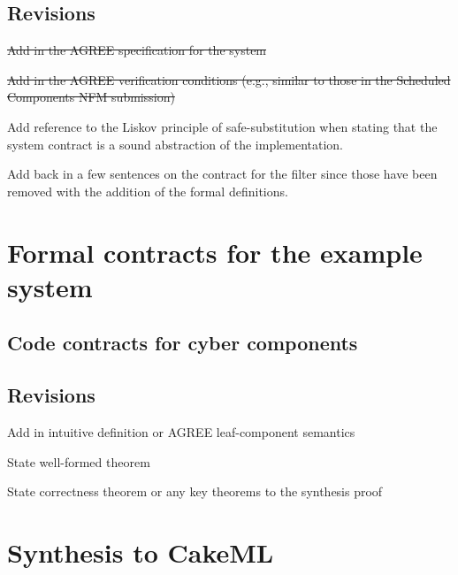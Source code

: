 \documentclass[global,twocolumn]{svjour}
\begin{document}
\subsection{Revisions}
\begin{compactitem}
  \item \sout{Add in the AGREE specification for the system}
  \item \sout{Add in the AGREE verification conditions (e.g., similar to those in the Scheduled Components NFM submission)}
  \item Add reference to the Liskov principle of safe-substitution when stating that the system contract is a sound abstraction of the implementation.
  \item Add back in a few sentences on the contract for the filter since those have been removed with the addition of the formal definitions.
\end{compactitem}

\section{Formal contracts for the example system}


\subsection{Code contracts for cyber components}



\subsection{Revisions}
\begin{compactitem}
  \item Add in intuitive definition or AGREE leaf-component semantics
  \item State well-formed theorem
  \item State correctness theorem or any key theorems to the synthesis proof
\end{compactitem}

\section{Synthesis to CakeML}
\label{sec:synthesis}

\end{document}
